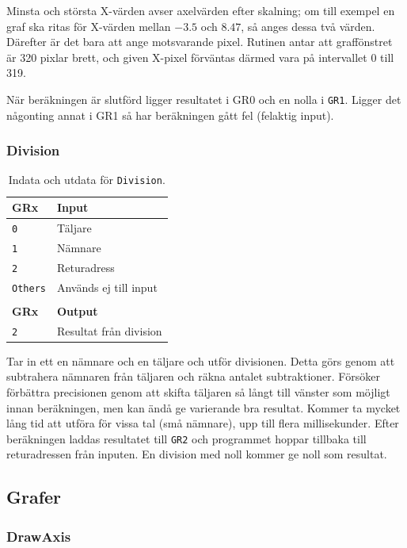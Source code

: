 \documentclass[]{article}
\begin{document}
Minsta och största X-värden avser axelvärden efter skalning; om till exempel en graf ska ritas för X-värden mellan $-3.5$ och $8.47$, så anges dessa två värden. Därefter är det bara att ange motsvarande pixel. Rutinen antar att graffönstret är 320 pixlar brett, och given X-pixel förväntas därmed vara på intervallet 0 till 319.

När beräkningen är slutförd ligger resultatet i GR0 och en nolla i \texttt{GR1}. Ligger det någonting annat i GR1 så har beräkningen gått fel (felaktig input).

\subsubsection{Division}
\begin{table}[H]
\centering
\begin{tabular}{ll}
	\textbf{GRx}    & \textbf{Input}         \\ \hline
	\texttt{0}      & Täljare                \\
	\texttt{1}      & Nämnare                \\
	\texttt{2}      & Returadress            \\
	\texttt{Others} & Används ej till input  \\
	                &  \\
	\textbf{GRx}    & \textbf{Output}        \\ \hline
	\texttt{2}      & Resultat från division
\end{tabular}
\caption{Indata och utdata för \texttt{Division}.}
\end{table}

\noindent
Tar in ett en nämnare och en täljare och utför divisionen. Detta görs genom att subtrahera nämnaren från täljaren och räkna antalet subtraktioner. Försöker förbättra precisionen genom att skifta täljaren så långt till vänster som möjligt innan beräkningen, men kan ändå ge varierande bra resultat. Kommer ta mycket lång tid att utföra för vissa tal (små nämnare), upp till flera millisekunder. Efter beräkningen laddas resultatet till \texttt{GR2} och programmet hoppar tillbaka till returadressen från inputen. En division med noll kommer ge noll som resultat.

\subsection{Grafer}

\subsubsection{DrawAxis}
\label{sec:drawaxis}
\end{document}
